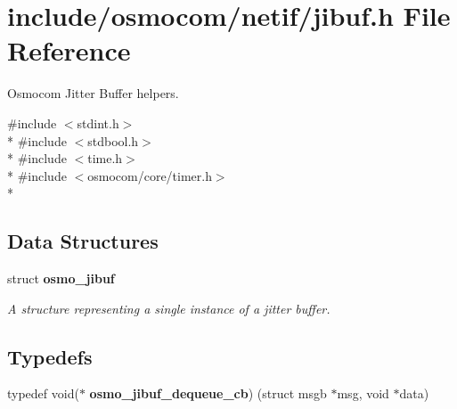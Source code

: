 \section{include/osmocom/netif/jibuf.h File Reference}
\label{jibuf_8h}


Osmocom Jitter Buffer helpers.  


{\ttfamily \#include $<$stdint.\+h$>$}\\*
{\ttfamily \#include $<$stdbool.\+h$>$}\\*
{\ttfamily \#include $<$time.\+h$>$}\\*
{\ttfamily \#include $<$osmocom/core/timer.\+h$>$}\\*
\subsection*{Data Structures}
\begin{DoxyCompactItemize}
\item 
struct {\bf osmo\+\_\+jibuf}
\begin{DoxyCompactList}\small\item\em A structure representing a single instance of a jitter buffer. \end{DoxyCompactList}\end{DoxyCompactItemize}
\subsection*{Typedefs}
\begin{DoxyCompactItemize}
\item 
typedef void($\ast$ {\bfseries osmo\+\_\+jibuf\+\_\+dequeue\+\_\+cb}) (struct msgb $\ast$msg, void $\ast$data)
\end{DoxyCompactItemize}

